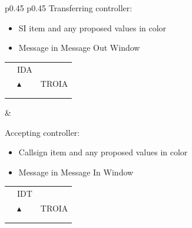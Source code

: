 \documentclass[a4paper,oneside,11pt]{memoir}
\begin{document}
\begin{longtable}{p{} p{}}
  Transferring controller:

\begin{itemize}
  \item SI item and any proposed values in  color
  \item Message in Message Out Window
\end{itemize}

\begin{tabular}{
  >{\columncolor{Flight Highlight}}l 
  >{\columncolor{Flight Highlight}}l
  >{\columncolor{Flight Highlight}}l }
  {\color{Assumed} ABC123} & {\color{Proposition In} IDA}       & {\color{Assumed} }\\
  {\color{Assumed} 100}    & {\color{Assumed} $\blacktriangle$} & {\color{Assumed} TROIA}\\
  {\color{Assumed} 180}    & {\color{Assumed} }          & {\color{Assumed} }\\  
  {\color{Proposition In} H360}    & {\color{Assumed} }          & {\color{Assumed} }\\  
\end{tabular}
  &
  
  Accepting controller:

\begin{itemize}
  \item Callsign item and any proposed values in  color
  \item Message in Message In Window
\end{itemize}

\begin{tabular}{
  >{\columncolor{Flight Highlight}}l 
  >{\columncolor{Flight Highlight}}l
  >{\columncolor{Flight Highlight}}l }
  {\color{Proposition In} ABC123} & {\color{Coordination} IDT}       & {\color{Coordination} }\\
  {\color{Coordination} 100}    & {\color{Coordination} $\blacktriangle$} & {\color{Coordination} TROIA}\\
  {\color{Coordination} 180}    & {\color{Coordination} }          & {\color{Coordination} }\\
  {\color{Proposition In} H360}    & {\color{Coordination} }          & {\color{Coordination} }\\      
\end{tabular}
\end{longtable}

\bigskip
\end{document}
